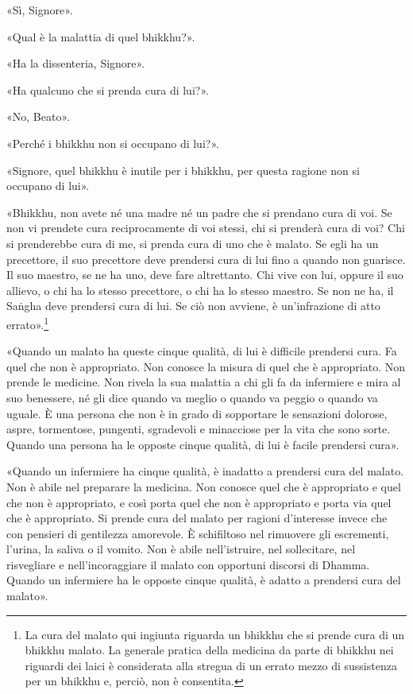 «Sì, Signore».


«Qual è la malattia di quel bhikkhu?».


«Ha la dissenteria, Signore».


«Ha qualcuno che si prenda cura di lui?».


«No, Beato».


«Perché i bhikkhu non si occupano di lui?».


«Signore, quel bhikkhu è inutile per i bhikkhu, per questa ragione non
si occupano di lui».


«Bhikkhu, non avete né una madre né un padre che si prendano cura di
voi. Se non vi prendete cura reciprocamente di voi stessi, chi si
prenderà cura di voi? Chi si prenderebbe cura di me, si prenda cura di
uno che è malato. Se egli ha un precettore, il suo precettore deve
prendersi cura di lui fino a quando non guarisce. Il suo maestro, se ne
ha uno, deve fare altrettanto. Chi vive con lui, oppure il suo allievo,
o chi ha lo stesso precettore, o chi ha lo stesso maestro. Se non ne ha,
il Saṅgha deve prendersi cura di lui. Se ciò non avviene, è
un’infrazione di atto errato».\footnote{La cura del malato qui ingiunta riguarda un bhikkhu che si prende cura di un bhikkhu malato. La generale pratica della medicina da parte di bhikkhu nei riguardi dei laici è considerata alla stregua di un errato mezzo di sussistenza per un bhikkhu e, perciò, non è consentita.}


«Quando un malato ha queste cinque qualità, di lui è difficile prendersi
cura. Fa quel che non è appropriato. Non conosce la misura di quel che è
appropriato. Non prende le medicine. Non rivela la sua malattia a chi
gli fa da infermiere e mira al suo benessere, né gli dice quando va
meglio o quando va peggio o quando va uguale. È una persona che non è in
grado di sopportare le sensazioni dolorose, aspre, tormentose, pungenti,
sgradevoli e minacciose per la vita che sono sorte. Quando una persona
ha le opposte cinque qualità, di lui è facile prendersi cura».




«Quando un infermiere ha cinque qualità, è inadatto a prendersi cura del
malato. Non è abile nel preparare la medicina. Non conosce quel che è
appropriato e quel che non è appropriato, e così porta quel che non è
appropriato e porta via quel che è appropriato. Si prende cura del
malato per ragioni d’interesse invece che con pensieri di gentilezza
amorevole. È schifiltoso nel rimuovere gli escrementi, l’urina, la
saliva o il vomito. Non è abile nell’istruire, nel sollecitare, nel
risvegliare e nell’incoraggiare il malato con opportuni discorsi di
Dhamma. Quando un infermiere ha le opposte cinque qualità, è adatto a
prendersi cura del malato».


